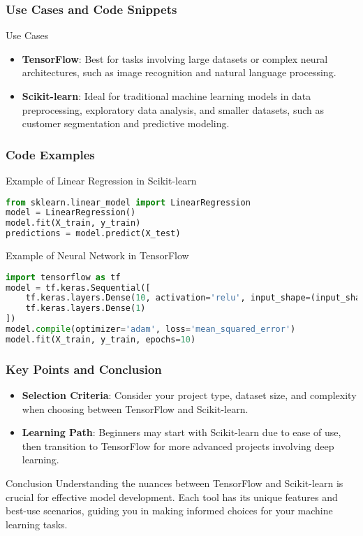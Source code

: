 \documentclass[aspectratio=169]{beamer}
\begin{document}
\begin{frame}[fragile]
    \frametitle{Use Cases and Code Snippets}
    \begin{block}{Use Cases}
        \begin{itemize}
            \item \textbf{TensorFlow}: Best for tasks involving large datasets or complex neural architectures, such as image recognition and natural language processing.
            \item \textbf{Scikit-learn}: Ideal for traditional machine learning models in data preprocessing, exploratory data analysis, and smaller datasets, such as customer segmentation and predictive modeling.
        \end{itemize}
    \end{block}
\end{frame}

\begin{frame}[fragile]
    \frametitle{Code Examples}
    \begin{block}{Example of Linear Regression in Scikit-learn}
        \begin{lstlisting}[language=Python]
from sklearn.linear_model import LinearRegression
model = LinearRegression()
model.fit(X_train, y_train)
predictions = model.predict(X_test)
        \end{lstlisting}
    \end{block}
    \begin{block}{Example of Neural Network in TensorFlow}
        \begin{lstlisting}[language=Python]
import tensorflow as tf
model = tf.keras.Sequential([
    tf.keras.layers.Dense(10, activation='relu', input_shape=(input_shape,)),
    tf.keras.layers.Dense(1)
])
model.compile(optimizer='adam', loss='mean_squared_error')
model.fit(X_train, y_train, epochs=10)
        \end{lstlisting}
    \end{block}
\end{frame}

\begin{frame}[fragile]
    \frametitle{Key Points and Conclusion}
    \begin{itemize}
        \item \textbf{Selection Criteria}: Consider your project type, dataset size, and complexity when choosing between TensorFlow and Scikit-learn.
        \item \textbf{Learning Path}: Beginners may start with Scikit-learn due to ease of use, then transition to TensorFlow for more advanced projects involving deep learning.
    \end{itemize}
    \begin{block}{Conclusion}
        Understanding the nuances between TensorFlow and Scikit-learn is crucial for effective model development. Each tool has its unique features and best-use scenarios, guiding you in making informed choices for your machine learning tasks.
    \end{block}
\end{frame}
\end{document}

